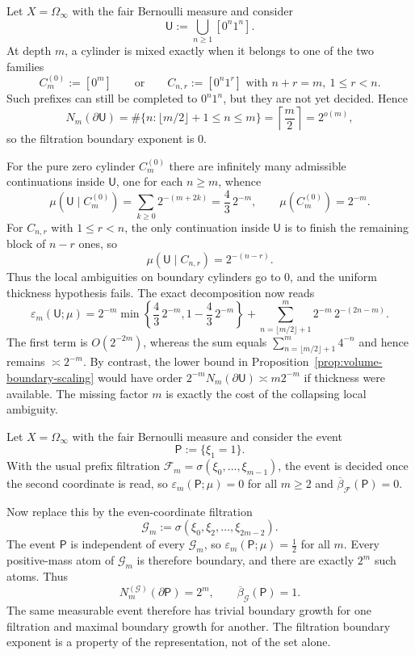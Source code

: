 \begin{example}
\label{ex:thickness-failure}
Let $X=\Omega_\infty$ with the fair Bernoulli measure and consider
\[
\mathsf{U}:=\bigcup_{n\ge 1}[0^n1^n].
\]
At depth $m$, a cylinder is mixed exactly when it belongs to one of the two
families
\[
C_m^{(0)}:=[0^m]
\qquad\text{or}\qquad
C_{n,r}:=[0^n1^r]\text{ with }n+r=m,\ 1\le r<n.
\]
Such prefixes can still be completed to $0^n1^n$, but they are not yet
decided.  Hence
\[
N_m(\partial\mathsf{U})=\#\{n:\lfloor m/2\rfloor+1\le n\le m\}
=\left\lceil\frac{m}{2}\right\rceil
=2^{o(m)},
\]
so the filtration boundary exponent is $0$.

For the pure zero cylinder $C_m^{(0)}$ there are infinitely many admissible
continuations inside $\mathsf{U}$, one for each $n\ge m$, whence
\[
\mu(\mathsf{U}\mid C_m^{(0)})=\sum_{k\ge 0}2^{-(m+2k)}
=\frac{4}{3}\,2^{-m},
\qquad
\mu(C_m^{(0)})=2^{-m}.
\]
For $C_{n,r}$ with $1\le r<n$, the only continuation inside $\mathsf{U}$ is to
finish the remaining block of $n-r$ ones, so
\[
\mu(\mathsf{U}\mid C_{n,r})=2^{-(n-r)}.
\]
Thus the local ambiguities on boundary cylinders go to $0$, and the uniform
thickness hypothesis fails.  The exact decomposition now reads
\[
\varepsilon_m(\mathsf{U};\mu)
=2^{-m}\min\!\left\{\frac{4}{3}\,2^{-m},1-\frac{4}{3}\,2^{-m}\right\}
+\sum_{n=\lfloor m/2\rfloor+1}^{m}2^{-m}\,2^{-(2n-m)}.
\]
The first term is $O(2^{-2m})$, whereas the sum equals
$\sum_{n=\lfloor m/2\rfloor+1}^{m}4^{-n}$ and hence remains $\asymp 2^{-m}$.
By contrast, the lower bound in
Proposition~\ref{prop:volume-boundary-scaling} would have order
$2^{-m}N_m(\partial\mathsf{U})\asymp m2^{-m}$ if thickness were available.
The missing factor $m$ is exactly the cost of the collapsing local ambiguity.
\end{example}

\begin{example}
\label{ex:filtration-dependence}
Let $X=\Omega_\infty$ with the fair Bernoulli measure and consider the event
\[
\mathsf{P}:=\{\xi_1=1\}.
\]
With the usual prefix filtration
$\mathcal{F}_m=\sigma(\xi_0,\ldots,\xi_{m-1})$, the event is decided once the
second coordinate is read, so $\varepsilon_m(\mathsf{P};\mu)=0$ for all
$m\ge 2$ and $\overline{\beta}_{\mathcal{F}}(\mathsf{P})=0$.

Now replace this by the even-coordinate filtration
\[
\mathcal{G}_m:=\sigma(\xi_0,\xi_2,\ldots,\xi_{2m-2}).
\]
The event $\mathsf{P}$ is independent of every $\mathcal{G}_m$, so
$\varepsilon_m(\mathsf{P};\mu)=\frac12$ for all $m$.  Every positive-mass atom
of $\mathcal{G}_m$ is therefore boundary, and there are exactly $2^m$ such
atoms.  Thus
\[
N_m^{(\mathcal{G})}(\partial\mathsf{P})=2^m,
\qquad
\overline{\beta}_{\mathcal{G}}(\mathsf{P})=1.
\]
The same measurable event therefore has trivial boundary growth for one
filtration and maximal boundary growth for another.  The filtration boundary
exponent is a property of the representation, not of the set alone.
\end{example}

